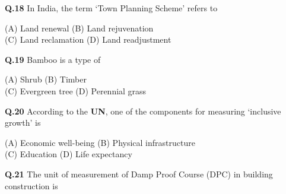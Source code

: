 \documentclass{article}
\begin{document}
\vspace{0.5cm}

\textbf{Q.18} \hspace{0.3cm} In India, the term ‘Town Planning Scheme’ refers to

\begin{flushleft}
    

\hspace{1.8cm}(A) Land renewal \hspace{2.655cm} (B) Land rejuvenation \\
\hspace{1.8cm}(C) Land reclamation \hspace{2.04cm} (D) Land readjustment 
\end{flushleft}

\vspace{0.5cm}

\textbf{Q.19} \hspace{0.3cm} Bamboo is a type of

\begin{flushleft}

\hspace{1.8cm}(A) Shrub \hspace{3.9cm} (B) Timber \\
\hspace{1.8cm}(C) Evergreen tree \hspace{2.6cm} (D) Perennial grass 
\end{flushleft}

\vspace{0.5cm}

\textbf{Q.20} \hspace{0.3cm} According to the \textbf{UN}, one of the components for measuring ‘inclusive growth’ is

\begin{flushleft}
    
\hspace{1.8cm}(A) Economic well-being \hspace{1.7cm} (B) Physical infrastructure \\
\hspace{1.8cm}(C) Education \hspace{3.3cm} (D) Life expectancy 
\end{flushleft}

\vspace{0.5cm}

\textbf{Q.21} \hspace{0.3cm} The unit of measurement of Damp Proof Course (DPC) in building construction is
\end{document}
